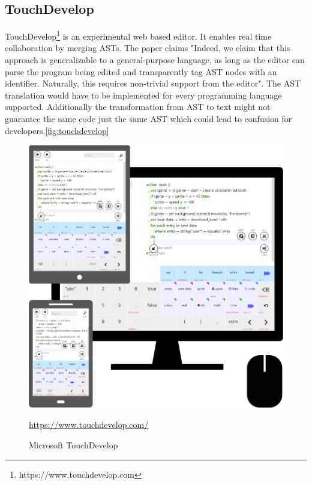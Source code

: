 \subsection{TouchDevelop}
TouchDevelop\footnote{https://www.touchdevelop.com} is an experimental web based editor. It enables real time collaboration by merging ASTs. The paper claims "Indeed, we claim that this approach is generalizable to a
general-purpose language, as long as the editor can parse the
program being edited and transparently tag AST nodes with
an identifier. Naturally, this requires non-trivial support from
the editor".\cite{ProtzenkoBurckhardtMoskalMcClurg:2015:Implementingreal-timecollaborationinTouchDevelopusingASTmerges} The AST translation would have to be implemented for every programming language supported. Additionally the transformation from AST to text might not guarantee the same code just the same AST which could lead to confusion for developers.\autoref{fig:touchdevelop}
\begin{figure}[hb]
    \centering
    \includegraphics{figures/screenshots/touchdevelop.png}
	\caption{Microsoft TouchDevelop }
	\href{https://www.touchdevelop.com/}{https://www.touchdevelop.com/}
    \label{fig:touchdevelop}
\end{figure}
